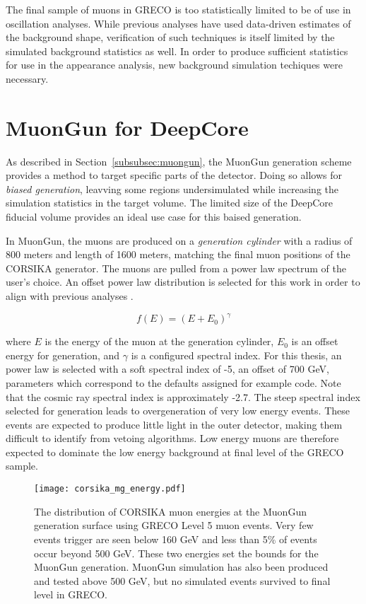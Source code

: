 The final sample of muons in GRECO is too statistically limited to be of use in oscillation analyses. 
While previous analyses have used data-driven estimates of the background shape, verification of such techniques is itself limited by the simulated background statistics as well.
In order to produce sufficient statistics for use in the appearance analysis, new background simulation techiques were necessary.

\label{sec:muongun_deepcore}
\section{MuonGun for DeepCore}
As described in Section~\ref{subsubsec:muongun}, the MuonGun generation scheme provides a method to target specific parts of the detector.
Doing so allows for \emph{biased generation}, leavving some regions undersimulated while increasing the simulation statistics in the target volume.
The limited size of the DeepCore fiducial volume provides an ideal use case for this baised generation.

In MuonGun, the muons are produced on a \emph{generation cylinder} with a radius of 800 meters and length of 1600 meters, matching the final muon positions of the CORSIKA generator.
The muons are pulled from a power law spectrum of the user's choice.
An offset power law distribution is selected for this work in order to align with previous analyses \cite{Thesis-Jakob}. 

\begin{equation}
f\left(E\right) = \left(E + E_0\right)^{\gamma}
\end{equation}

where $E$ is the energy of the muon at the generation cylinder, $E_0$ is an offset energy for generation, and $\gamma$ is a configured spectral index.
For this thesis, an power law is selected with a soft spectral index of -5, an offset of 700 GeV, parameters which correspond to the defaults assigned for example code.
Note that the cosmic ray spectral index is approximately -2.7.
The steep spectral index selected for generation leads to overgeneration of very low energy events.
These events are expected to produce little light in the outer detector, making them difficult to identify from vetoing algorithms. 
Low energy muons are therefore expected to dominate the low energy background at final level of the GRECO sample.

\begin{figure}
\centering
\texttt{[image: corsika\_mg\_energy.pdf]} 
\caption{The distribution of CORSIKA muon energies at the MuonGun generation surface using GRECO Level 5 muon events. Very few events trigger are seen below 160 GeV and less than 5\% of events occur beyond 500 GeV. These two energies set the bounds for the MuonGun generation. MuonGun simulation has also been produced and tested above 500 GeV, but no simulated events survived to final level in GRECO.}
\label{fig:muongun_energies}
\end{figure}

